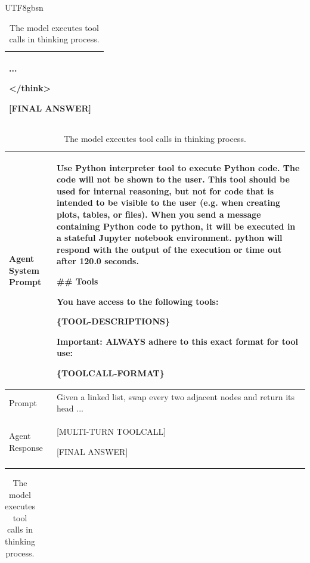 \documentclass[11pt, a4paper, logo, copyright, nonumbering]{deepseek}
\begin{document}
\begin{CJK*}{UTF8}{gbsn}
\begin{table}[htbp]
\begin{minipage}{\textwidth}
\begin{tabular}{p{}|p{}}
    ...

    </think>

    [FINAL ANSWER]
    
    \\ 
     \bottomrule
    \end{tabular}

\end{minipage}
\hfill
\begin{minipage}{\textwidth}
\centering
   \small
        \caption{ \{TOOL-DESCRIPTIONS\} and \{TOOLCALL-FORMAT\} will be replaced with the specific tools and our designed toolcall format.}
    \label{tab:agent_template}
    
    \begin{tabular}{p{}|p{}}
    \toprule

    Agent System Prompt &  Use Python interpreter tool to execute Python code. The code will not be shown to the user. This tool should be used for internal reasoning, but not for code that is intended to be visible to the user (e.g. when creating plots, tables, or files). When you send a message containing Python code to python, it will be executed in a stateful Jupyter notebook environment. python will respond with the output of the execution or time out after 120.0 seconds.

    \#\# Tools
    
You have access to the following tools:

\{TOOL-DESCRIPTIONS\}

  Important: ALWAYS adhere to this exact format for tool use:

\{TOOLCALL-FORMAT\}

    \\ \hline
    Prompt &Given a linked list, swap every two adjacent nodes and return its head ... \\ \hline
    Agent Response & [MULTI-TURN TOOLCALL]
    
    [FINAL ANSWER] \\ 
     \bottomrule
    \end{tabular}

\end{minipage}

\begin{minipage}{\textwidth}
 \centering
    \small
        \caption{  The model executes tool calls in thinking process.}
   \label{tab:agentthink_template}
       \begin{tabular}{p{}|p{}}
    \toprule


\end{tabular}
\end{minipage}
\end{table}
\end{CJK*}
\end{document}
